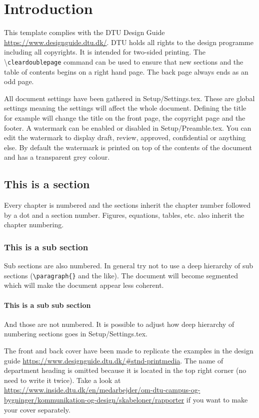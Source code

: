 \chapter{Introduction}
This template complies with the DTU Design Guide
\url{https://www.designguide.dtu.dk/}. DTU holds all rights to the
design programme including all copyrights. It is intended for
two-sided printing. The \textbackslash \texttt{cleardoublepage}
command can be used to ensure that new sections and the table of
contents begins on a right hand page. The back page always ends as an odd page.

All document settings have been gathered in Setup/Settings.tex. These
are global settings meaning the settings will affect the whole
document. Defining the title for example will change the title on the
front page, the copyright page and the footer. A watermark can be
enabled or disabled in Setup/Preamble.tex. You can edit the
watermark to display draft, review, approved, confidential or
anything else. By default the watermark is printed on top of the
contents of the document and has a transparent grey colour.

\section{This is a section}
Every chapter is numbered and the sections inherit the chapter number
followed by a dot and a section number. Figures, equations, tables,
etc. also inherit the chapter numbering.

\subsection{This is a sub section}
Sub sections are also numbered. In general try not to use a deep
hierarchy of sub sections (\texttt{\textbackslash paragraph\{\}} and
the like). The document will become segmented which will make the
document appear less coherent.

\subsubsection{This is a sub sub section}
And those are not numbered. It is possible to adjust how deep
hierarchy of numbering sections goes in Setup/Settings.tex.

The front and back cover have been made to replicate the examples in
the design guide
\url{https://www.designguide.dtu.dk/#stnd-printmedia}. The name of
department heading is omitted  because it is located in the top right
corner (no need to write it twice). Take a look at
\url{https://www.inside.dtu.dk/en/medarbejder/om-dtu-campus-og-bygninger/kommunikation-og-design/skabeloner/rapporter}
if you want to make your cover separately.

